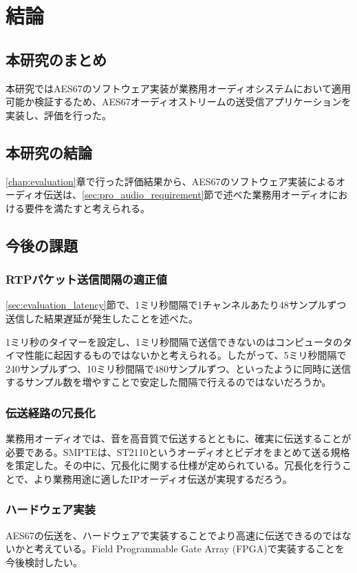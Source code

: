 \chapter{結論}
\label{chap:conclusion}

\section{本研究のまとめ}
\label{section:conclusion}

本研究ではAES67のソフトウェア実装が業務用オーディオシステムにおいて適用可能か検証するため、AES67オーディオストリームの送受信アプリケーションを実装し、評価を行った。

\section{本研究の結論}

\ref{chap:evaluation}章で行った評価結果から、AES67のソフトウェア実装によるオーディオ伝送は、\ref{sec:pro_audio_requirement}節で述べた業務用オーディオにおける要件を満たすと考えられる。

\section{今後の課題}

\subsection{RTPパケット送信間隔の適正値}

\ref{sec:evaluation_latency}節で、1ミリ秒間隔で1チャンネルあたり48サンプルずつ送信した結果遅延が発生したことを述べた。

1ミリ秒のタイマーを設定し、1ミリ秒間隔で送信できないのはコンピュータのタイマ性能に起因するものではないかと考えられる。したがって、5ミリ秒間隔で240サンプルずつ、10ミリ秒間隔で480サンプルずつ、といったように同時に送信するサンプル数を増やすことで安定した間隔で行えるのではないだろうか。

\subsection{伝送経路の冗長化}

業務用オーディオでは、音を高音質で伝送するとともに、確実に伝送することが必要である。SMPTEは、ST2110\cite{smpte-st2110}というオーディオとビデオをまとめて送る規格を策定した。その中に、冗長化に関する仕様が定められている。冗長化を行うことで、より業務用途に適したIPオーディオ伝送が実現するだろう。

\subsection{ハードウェア実装}

AES67の伝送を、ハードウェアで実装することでより高速に伝送できるのではないかと考えている。Field Programmable Gate Array (FPGA)で実装することを今後検討したい。
